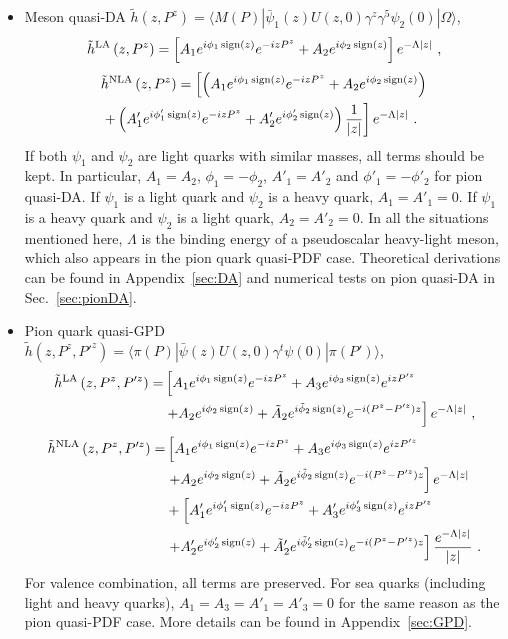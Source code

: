 \documentclass[a4paper,11pt]{article}
\begin{document}
\begin{itemize}
\item Meson quasi-DA $\tilde{h}\left(z,P^z\right) = \langle M(P) | \bar{\psi}_1(z) U(z,0) \gamma^z \gamma^5 \psi_{2}(0) | \Omega \rangle$, 
\begin{align}
\tilde{h}^{\rm LA}\left(z,P^z\right) = 
\left[A_1 e^{i \phi_1 \, {\rm sign}(z)} e^{-i z P^z} + A_2 e^{i \phi_2 \, {\rm sign}(z)} \right]e^{-\Lambda |z|}  \ ,
\end{align}
\begin{align}
&\tilde{h}^{\rm NLA}\left(z,P^z\right) = 
\left[ \left(A_1 e^{i \phi_1 \, {\rm sign}(z)} e^{-i z P^z} + A_2 e^{i \phi_2 \, {\rm sign}(z)} \right) \right. \nonumber\\
&\left.+ \left(A'_1 e^{i \phi'_1 \, {\rm sign}(z)} e^{-i z P^z} + A'_2 e^{i \phi'_2 \, {\rm sign}(z)} \right) \frac{1}{|z|} \right] e^{-\Lambda |z|}  \ .
\end{align}
If both $\psi_1$ and $\psi_2$ are light quarks with similar masses, all terms should be kept. In particular, $A_1=A_2$, $\phi_1=-\phi_2$, $A'_1=A'_2$ and $\phi'_1=-\phi'_2$ for pion quasi-DA. If $\psi_1$ is a light quark and $\psi_2$ is a heavy quark, $A_1 = A'_1 = 0$. If $\psi_1$ is a heavy quark and $\psi_2$ is a light quark, $A_2 = A'_2 = 0$. In all the situations mentioned here, $\Lambda$ is the binding energy of a pseudoscalar heavy-light meson, which also appears in the pion quark quasi-PDF case. Theoretical derivations can be found in Appendix~\ref{sec:DA} and numerical tests on pion quasi-DA in Sec.~\ref{sec:pionDA}.

\item Pion quark quasi-GPD $\tilde{h}\left(z,P^z,P'^z\right)=\langle \pi(P) | \bar{\psi}(z) U(z,0) \gamma^t  \psi(0) | \pi(P') \rangle$,
\begin{align}
\tilde{h}^{\rm LA}\left(z,P^z,P'^z\right) =
&\left[A_1 e^{i \phi_1 \, {\rm sign}(z)} e^{-i z P^z} + A_3 e^{i \phi_3 \, {\rm sign}(z)} e^{i z P'^z}  \right. \nonumber\\
&\left.+A_2 e^{i \phi_2 \, {\rm sign}(z)} + \tilde{A}_2 e^{i \tilde{\phi}_2 \, {\rm sign}(z)} e^{-i(P^z-P'^z)z}  \right] e^{-\Lambda |z|} \ ,
\end{align}
\begin{align}
\tilde{h}^{\rm NLA}\left(z,P^z,P'^z\right) =
&\left[A_1 e^{i \phi_1 \, {\rm sign}(z)} e^{-i z P^z}  + A_3 e^{i \phi_3 \, {\rm sign}(z)} e^{i z P'^z} \right. \nonumber\\
&\left.+A_2 e^{i \phi_2 \, {\rm sign}(z)} + \tilde{A}_2 e^{i \tilde{\phi}_2 \, {\rm sign}(z)} e^{-i(P^z-P'^z)z}\right]e^{-\Lambda |z|} \nonumber\\ 
&+\left[A'_1 e^{i \phi'_1 \, {\rm sign}(z)} e^{-i z P^z} + A'_3 e^{i \phi'_3 \, {\rm sign}(z)} e^{i z P'^z} \right. \nonumber\\
&\left.+A'_2 e^{i \phi'_2 \, {\rm sign}(z)} + \tilde{A}'_2 e^{i \tilde{\phi}'_2 \, {\rm sign}(z)} e^{-i(P^z-P'^z)z} \right] \frac{e^{-\Lambda |z|}}{|z|} \ .
\end{align}
For valence combination, all terms are preserved. For sea quarks (including light and heavy quarks),  $A_1 = A_3 = A'_1 = A'_3 = 0$ for the same reason as the pion quasi-PDF case. More details can be found in Appendix~\ref{sec:GPD}.


\end{itemize}
\end{document}
